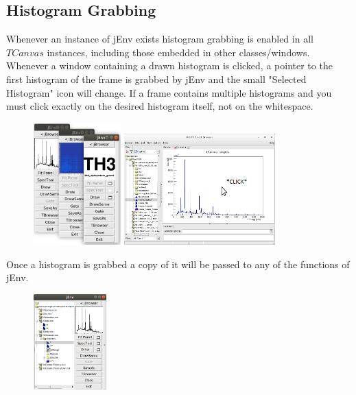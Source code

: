 \documentclass[a4paper,10pt]{article}
\begin{document}
\subsection{Histogram Grabbing}
Whenever an instance of jEnv exists histogram grabbing is enabled in all $TCanvas$ instances, including those embedded in other classes/windows. Whenever a window containing a drawn histogram is clicked, a pointer to the first histogram of the frame is grabbed by jEnv and the small "Selected Histogram" icon will change. If a frame contains multiple histograms and you must click exactly on the desired histogram itself, not on the whitespace.

\begin{figure}[!h]
\centering
\includegraphics[width=0.3\textwidth]{jEnvB.png}
\includegraphics[width=0.52\textwidth]{jEnvD.png}     
\end{figure}

Once a histogram is grabbed a copy of it will be passed to any of the functions of jEnv.

\newpage
\begin{figure}
\includegraphics[width=0.25\textwidth]{jEnvE.png}
\end{figure}
\end{document}
